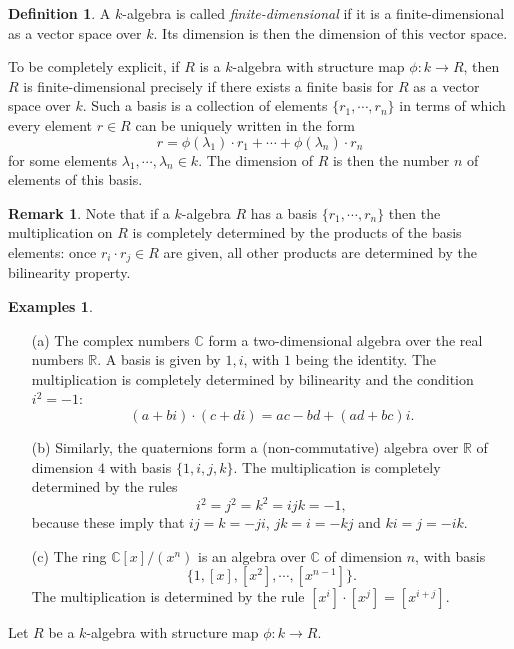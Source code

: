 \documentclass [12pt,oneside,a4paper,mathscr]{amsart}
\theoremstyle{definition}
\newtheorem{defn}[thm]{Definition}
\newtheorem{remark}[thm]{Remark}
\newtheorem{examples}[thm]{Examples}
\newcommand {\C}{\mathbb C}
\newcommand{\R}{\mathbb{R}}
\begin{document}
\begin{defn}
A $k$-algebra is called \emph{finite-dimensional} if it is a finite-dimensional as a vector space over $k$.  Its dimension is then the dimension of this vector space.
\end{defn}

To be completely explicit, if $R$ is a $k$-algebra with structure map $\phi\colon k \to R$, then $R$ is finite-dimensional precisely if there exists a finite basis for $R$ as a vector space over $k$. Such a basis  is a collection of elements $\{r_1,\cdots, r_n\}$ in terms of which every element $r\in R$ can be uniquely written in the form
\[r= \phi(\lambda_1) \cdot r_1 + \cdots + \phi(\lambda_n)\cdot r_n\]
for some elements $\lambda_1,\cdots,\lambda_n\in k$.
The dimension of $R$ is then the number $n$ of elements of this basis.

\begin{remark}Note that if a $k$-algebra $R$ has a basis $\{r_1,\cdots,r_n\}$ then  the multiplication on $R$ is completely determined by the products of the basis elements: once $r_i\cdot r_j\in R$ are given, all other products are determined by the bilinearity property.
\end{remark}


\begin{examples}
\begin{itemize}
\item[(a)] The complex numbers $\C$ form a two-dimensional algebra over the real numbers $\R$. A basis is given by ${1,i}$, with $1$ being the identity.  The multiplication is completely determined by bilinearity and the  condition $i^2=-1$:
\[(a+bi)\cdot (c+di)=ac-bd + (ad+bc)i.\]
 
\item[(b)] Similarly, the quaternions form a (non-commutative) algebra over $\R$ of dimension $4$ with basis
$\{1,i,j,k\}$. The multiplication is completely determined by the rules
\[i^2=j^2=k^2=ijk=-1,\]
because these imply  that  $ij=k=-ji$, $jk=i=-kj$ and $ki=j=-ik$.\smallskip

\item[(c)] The ring $\C[x]/(x^n)$ is an algebra over $\C$ of dimension $n$, with basis
\[\{1,[x],[x^2], \cdots, [x^{n-1}]\}.\]
The multiplication is determined by the rule $[x^i]\cdot [x^j]=[x^{i+j}].$
\end{itemize}
\end{examples}
 
Let $R$ be a $k$-algebra with structure map $\phi\colon k\to R$.
\end{document}
